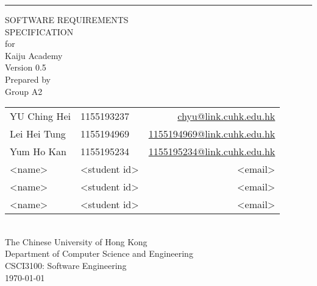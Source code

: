 \documentclass[a4paper, 11pt]{scrreprt}
\date{}
\def\myversion{0.5}
\def\projectname{Kaiju Academy}
\begin{document}

\begin{titlepage}
    \begin{flushright}
        \rule{\textwidth}{5pt}\vskip1cm
        \begin{bfseries}
            \Huge{SOFTWARE REQUIREMENTS\\ SPECIFICATION}\\
            \vspace{1.6cm}
            for\\
            \vspace{1.6cm}
            \projectname\\  %
            \vspace{1.6cm}
            \LARGE{Version \myversion}\\
            \vspace{1.6cm}
            Prepared by\\
            Group A2\\
            \vspace{0.5cm}
            \begin{tabularx}{\textwidth}{X l r}
            YU Ching Hei & 1155193237 & \href{mailto:chyu@link.cuhk.edu.hk}{chyu@link.cuhk.edu.hk}\\
            Lei Hei Tung & 1155194969 & \href{mailto:1155194969@link.cuhk.edu.hk}{1155194969@link.cuhk.edu.hk}\\
            Yum Ho Kan & 1155195234 & \href{mailto:1155195234@link.cuhk.edu.hk}{1155195234@link.cuhk.edu.hk}\\
            <name> & <student id> & <email>\\
            <name> & <student id> & <email>\\
            <name> & <student id> & <email>\\
            \end{tabularx}\\
            \vspace{1.6cm}
            The Chinese University of Hong Kong\\
            Department of Computer Science and Engineering\\
            CSCI3100: Software Engineering\\
            \vspace{1.6cm}
            \today\\
        \end{bfseries}
    \end{flushright}
\end{titlepage}
\end{document}
